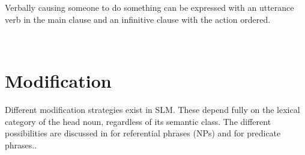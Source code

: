 
Verbally causing someone to do something can be expressed with an utterance verb in the main clause and an infinitive clause with the action ordered.

 \\


%

\section{Modification}\label{sec:func:Modification}
Different modification strategies exist in SLM. These depend fully on the lexical category of the head noun, regardless of its semantic class. The different possibilities are   discussed in  for referential phrases (NPs) and  for predicate phrases..

